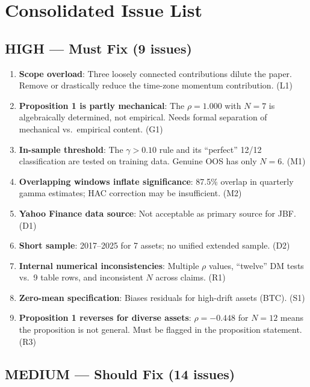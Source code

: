 \documentclass[12pt,a4paper]{article}
\begin{document}
\section*{Consolidated Issue List}

\subsection*{\textcolor{errorred}{HIGH --- Must Fix (9 issues)}}

\begin{enumerate}[label=H\arabic*.]
\item \textbf{Scope overload}: Three loosely connected contributions dilute the paper. Remove or drastically reduce the time-zone momentum contribution. (L1)
\item \textbf{Proposition 1 is partly mechanical}: The $\rho = 1.000$ with $N = 7$ is algebraically determined, not empirical. Needs formal separation of mechanical vs.\ empirical content. (G1)
\item \textbf{In-sample threshold}: The $\gamma > 0.10$ rule and its ``perfect'' 12/12 classification are tested on training data. Genuine OOS has only $N = 6$. (M1)
\item \textbf{Overlapping windows inflate significance}: 87.5\% overlap in quarterly gamma estimates; HAC correction may be insufficient. (M2)
\item \textbf{Yahoo Finance data source}: Not acceptable as primary source for JBF. (D1)
\item \textbf{Short sample}: 2017--2025 for 7 assets; no unified extended sample. (D2)
\item \textbf{Internal numerical inconsistencies}: Multiple $\rho$ values, ``twelve'' DM tests vs.\ 9 table rows, and inconsistent $N$ across claims. (R1)
\item \textbf{Zero-mean specification}: Biases residuals for high-drift assets (BTC). (S1)
\item \textbf{Proposition 1 reverses for diverse assets}: $\rho = -0.448$ for $N = 12$ means the proposition is not general. Must be flagged in the proposition statement. (R3)
\end{enumerate}

\subsection*{\textcolor{warncolor}{MEDIUM --- Should Fix (14 issues)}}
\end{document}

